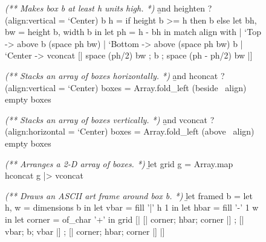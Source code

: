 \documentclass{article}
\begin{document}
\begin{figure}
\begin{code}[ocaml]
\emph{(** Makes box b at least h units high. *)}
\b{and} heighten ?(align:vertical = `Center) b h =\label{ref-heighten}
    if height b >= h then b
    else let bh, bw = height b, width b in
         let ph = h - bh in
         match align with
         | `Top    -> above b (space ph bw)
         | `Bottom -> above (space ph bw) b
         | `Center -> vconcat [| space (ph/2) bw
                               ; b
                               ; space (ph - ph/2) bw |]

\emph{(** Stacks an array of boxes horizontally. *)}
\b{and} hconcat ?(align:vertical = `Center) boxes =\label{ref-hconcat}
    Array.fold_left (beside ~align) empty boxes

\emph{(** Stacks an array of boxes vertically. *)}
\b{and} vconcat ?(align:horizontal = `Center) boxes =\label{ref-vconcat}
    Array.fold_left (above ~align) empty boxes

\emph{(** Arranges a 2-D array of boxes. *)}
\b{let} grid g = Array.map hconcat g |> vconcat\label{ref-grid}

\emph{(** Draws an ASCII art frame around box b. *)}
\b{let} framed b =
    let h, w = dimensions b in
    let vbar = fill '|' h 1 in
    let hbar = fill '-' 1 w in
    let corner = of_char '+' in
    grid [| [| corner; hbar; corner |]
          ; [| vbar;   b;    vbar   |]
          ; [| corner; hbar; corner |] |]
\end{code}
\end{figure}
\end{document}
